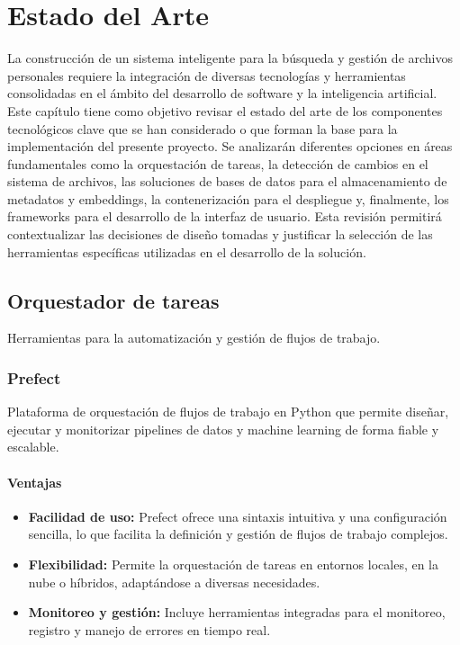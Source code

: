 
\chapter{Estado del Arte}
\label{marcoteorico}

La construcción de un sistema inteligente para la búsqueda y gestión de archivos personales requiere la integración de diversas tecnologías y herramientas consolidadas en el ámbito del desarrollo de software y la inteligencia artificial. Este capítulo tiene como objetivo revisar el estado del arte de los componentes tecnológicos clave que se han considerado o que forman la base para la implementación del presente proyecto. Se analizarán diferentes opciones en áreas fundamentales como la orquestación de tareas, la detección de cambios en el sistema de archivos, las soluciones de bases de datos para el almacenamiento de metadatos y embeddings, la contenerización para el despliegue y, finalmente, los frameworks para el desarrollo de la interfaz de usuario. Esta revisión permitirá contextualizar las decisiones de diseño tomadas y justificar la selección de las herramientas específicas utilizadas en el desarrollo de la solución.

\section{Orquestador de tareas}
Herramientas para la automatización y gestión de flujos de trabajo.

\subsection{Prefect}
Plataforma de orquestación de flujos de trabajo en Python que permite diseñar, ejecutar y monitorizar pipelines de datos y machine learning de forma fiable y escalable.

\subsubsection{Ventajas}
\begin{itemize}
    \item \textbf{Facilidad de uso:} Prefect ofrece una sintaxis intuitiva y una configuración sencilla, lo que facilita la definición y gestión de flujos de trabajo complejos.
    
    \item \textbf{Flexibilidad:} Permite la orquestación de tareas en entornos locales, en la nube o híbridos, adaptándose a diversas necesidades.
    
    \item \textbf{Monitoreo y gestión:} Incluye herramientas integradas para el monitoreo, registro y manejo de errores en tiempo real.
\end{itemize}

